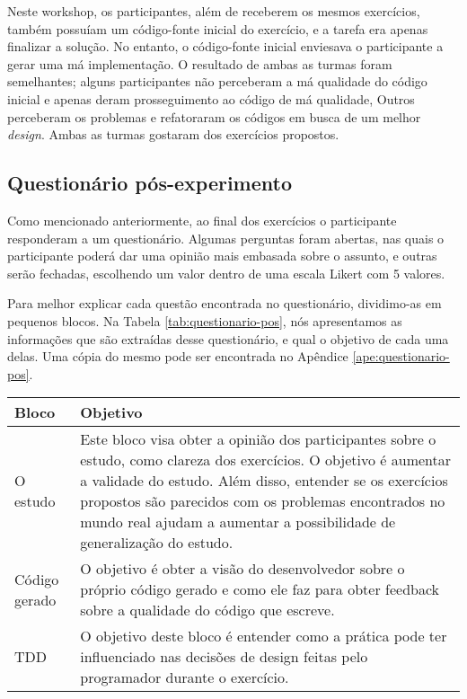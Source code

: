 Neste workshop, os participantes, além de receberem os mesmos
exercícios, também possuíam um código-fonte inicial do exercício, e a tarefa era
apenas finalizar a solução. No entanto, o código-fonte inicial enviesava o participante a gerar
uma má implementação. O resultado de ambas as turmas foram semelhantes; alguns participantes
não perceberam a má qualidade do código inicial e apenas deram prosseguimento ao código
de má qualidade, Outros perceberam os problemas e refatoraram os códigos em busca
de um melhor \textit{design}. Ambas as turmas gostaram dos exercícios
propostos.


\subsection{Questionário pós-experimento}
\label{sec:questionario}

Como mencionado anteriormente, ao final dos exercícios o participante responderam a um questionário.
Algumas perguntas foram abertas, nas quais o participante poderá dar uma opinião mais embasada sobre o assunto,
e outras serão fechadas, escolhendo um valor dentro de uma escala
Likert com 5 valores.

Para melhor explicar cada questão encontrada no questionário, dividimo-as em pequenos blocos. 
Na Tabela \ref{tab:questionario-pos}, nós apresentamos
as informações que são extraídas desse questionário, e qual o objetivo de cada uma delas. Uma cópia
do mesmo pode ser encontrada no Apêndice \ref{ape:questionario-pos}.

\begin{table}
	\begin{tabular}{ | p{5cm} | p{5cm} |}
		
		\hline
		
		Bloco & Objetivo \\
		
		\hline
		
		O estudo &
		Este bloco visa obter a opinião dos participantes sobre o estudo, como clareza dos
		exercícios. O objetivo é aumentar a validade do estudo.
		Além disso, entender se os exercícios propostos são parecidos com os problemas encontrados no mundo
		real ajudam a aumentar a possibilidade de generalização do estudo.
		\\ \hline
		
		Código gerado &
		O objetivo é obter a visão do desenvolvedor sobre o próprio código gerado e como ele
		faz para obter feedback sobre a qualidade do código que escreve.
		\\ \hline
		
		TDD &
		O objetivo deste bloco é entender como a prática pode ter influenciado
		nas decisões de design feitas pelo programador durante o exercício.
		
		\hline
		
	\end{tabular}
\end{table}

